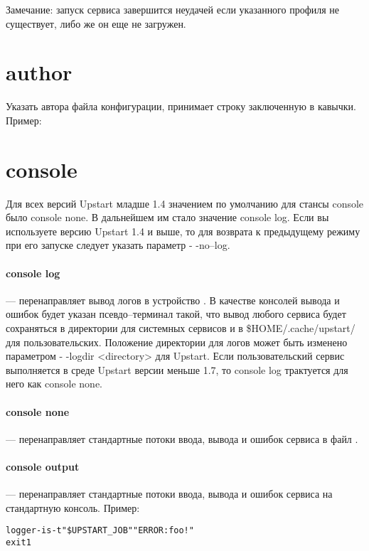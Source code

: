 Замечание: запуск сервиса завершится неудачей если указанного профиля не существует, либо же он еще не загружен.

\section{author} 

Указать автора файла конфигурации, принимает строку заключенную в кавычки. Пример: \begin{alltt}
\end{alltt}

\section{console}

Для всех версий Upstart младше 1.4 значением по умолчанию для стансы console было console none. В дальнейшем им стало значение console log. Если вы используете версию Upstart 1.4 и выше, то для возврата к предыдущему режиму при его запуске следует указать параметр - -no--log.

\paragraph{console log} --- перенаправляет вывод логов в устройство . В качестве консолей вывода и ошибок будет указан псевдо--терминал такой, что вывод любого сервиса будет сохраняться в директории  для системных сервисов и в \$HOME/.cache/upstart/ для пользовательских. Положение директории для логов может быть изменено параметром - -logdir <directory> для Upstart. Если пользовательский сервис выполняется в среде Upstart версии меньше 1.7, то console log трактуется для него как console none.

\paragraph{console none} --- перенаправляет стандартные потоки ввода, вывода и ошибок сервиса в файл .

\paragraph{console output} --- перенаправляет стандартные потоки ввода, вывода и ошибок сервиса на стандартную консоль. Пример: \begin{alltt}
logger -is -t "\$UPSTART\_JOB" "ERROR: foo!"
exit 1
\end{alltt}

